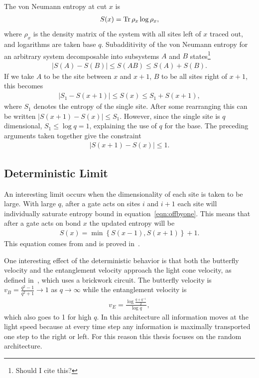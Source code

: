 \documentclass[11pt]{article}
\DeclareMathOperator{\Tr}{Tr}
\begin{document}
The von Neumann entropy at cut $x$ is
\begin{align}
S(x) = \-\Tr\rho_x\log\rho_x, \label{eqn:vonneu}
\end{align}
where $\rho_x$ is the density matrix of the system with all sites left of $x$ traced out, and logarithms are taken base $q$. Subadditivity of the von Neumann entropy for an arbitrary system decomposable into subsystems $A$ and $B$ states\footnote{Should I cite this?}
\begin{align}
\left|S(A)-S(B)\right| \leq S(AB)\leq S(A) + S(B). \label{eqn:subadd}
\end{align}
If we take $A$ to be the site between $x$ and $x+1$, $B$ to be all sites right of $x+1$, this becomes
\begin{align}
\left|S_1 - S(x+1)\right| \leq S(x) \leq S_1 + S(x+1),
\end{align}
where $S_1$ denotes the entropy of the single site. After some rearranging this can be written $\left|S(x+1) - S(x)\right| \leq S_1$. However, since the single site is $q$ dimensional, $S_1 \leq \log q = 1$, explaining the use of $q$ for the base. The preceding arguments taken together give the constraint
\begin{align}
\left|S(x+1) - S(x)\right| \leq 1. \label{eqn:offbyone}
\end{align}

\subsection{Deterministic Limit} \emph{} \label{sub:determ}

An interesting limit occurs when the dimensionality of each site is taken to be large. With large $q$, after a gate acts on sites $i$ and $i+1$ each site will individually saturate entropy bound in equation~\ref{eqn:offbyone}. This means that after a gate acts on bond $x$ the updated entropy will be 
\begin{align}
S(x) = \min\left\lbrace S(x-1), S(x+1)\right\rbrace + 1.\label{eqn:update}
\end{align}
This equation comes from and is proved in~\cite{Nahum2017}.

One interesting effect of the deterministic behavior is that both the butterfly velocity and the entanglement velocity approach the light cone velocity, as defined in~\cite{Keyserlingk}, which uses a brickwork circuit. The butterfly velocity is $v_B = \frac{q^2-1}{q^2+1} \to 1$ as $q\to \infty$ while the entanglement velocity is 
\begin{align}
v_E = \frac{\log\frac{q+q^{-1}}{2}}{\log q},
\end{align}
which also goes to 1 for high $q$. In this architecture all information moves at the light speed because at every time step any information is maximally transported one step to the right or left. For this reason this thesis focuses on the random architecture.
\end{document}
